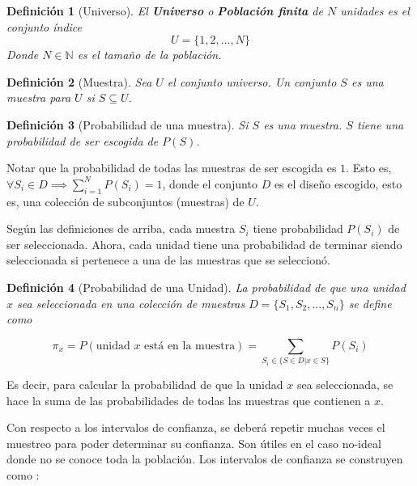 \documentclass{report}
\newtheorem{definition}{Definición}
\begin{document}
\begin{definition}[Universo]
    El \textbf{Universo} o \textbf{Población finita} de $N$ unidades es el conjunto índice
    $$
    U = \{ 1, 2, ..., N \}
    $$
    Donde $N \in \mathbb{N}$ es el tamaño de la población.
\end{definition}

\bigbreak

\begin{definition}[Muestra]
    Sea $U$ el conjunto universo. Un conjunto $S$ es una muestra para $U$ si $S \subseteq U$.
\end{definition}

\bigbreak

\begin{definition}[Probabilidad de una muestra]
    Si $S$ es una muestra. $S$ tiene una probabilidad de ser escogida de $P(S)$.
\end{definition}

\bigbreak

Notar que la probabilidad de todas las muestras de ser escogida es $1$. Esto es, $\forall S_i \in D \implies \sum \limits_{i=1}^{N} P(S_i) = 1$, donde el conjunto $D$ es el diseño escogido, esto es, una colección de subconjuntos (muestras) de $U$.

\bigbreak

Según las definiciones de arriba, cada muestra $S_i$ tiene probabilidad $P(S_i)$ de ser seleccionada. Ahora, cada unidad tiene una probabilidad de terminar siendo seleccionada si pertenece a una de las muestras que se seleccionó.

\begin{definition}[Probabilidad de una Unidad]
    La probabilidad de que una unidad $x$ sea seleccionada en una colección de muestras $D = \{ S_1, S_2, ..., S_n \}$ se define como
    
    $$
    \pi_x = P(\text{unidad $x$ está en la muestra}) = \sum \limits_{S_i \in \{ S \in D | x \in S \}} P(S_i)
    $$
\end{definition}

\bigbreak

Es decir, para calcular la probabilidad de que la unidad $x$ sea seleccionada, se hace la suma de las probabilidades de todas las muestras que contienen a $x$.

\bigbreak

Con respecto a los intervalos de confianza, se deberá repetir muchas veces el muestreo para poder determinar su confianza. Son útiles en el caso no-ideal donde no se conoce toda la población. Los intervalos de confianza se construyen como \cite{the-pennsylvania-state-university-no-date}:
\end{document}
